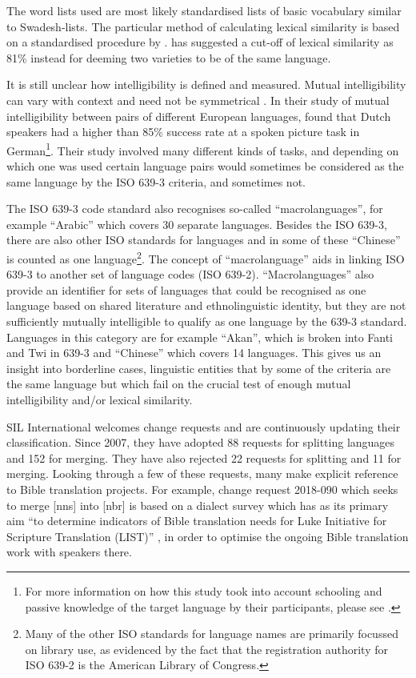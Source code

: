 \documentclass[a4paper,10pt]{article} %
\begin{document}
The word lists used are most likely standardised lists of basic vocabulary similar to Swadesh-lists. The particular method of calculating lexical similarity is based on a standardised procedure by \citet{rensch1992calculating}. \citet[326]{swadesh1954perspectives} has suggested a cut-off of lexical similarity as 81\% instead for deeming two varieties to be of the same language. 

It is still unclear how intelligibility is defined and measured. Mutual intelligibility can vary with context and need not be symmetrical \citep[356]{NETTLE1998}. In their study of mutual intelligibility between pairs of different European languages, \citet{gooskens2017measuring} found that Dutch speakers had a higher than 85\% success rate at a spoken picture task in German\footnote{For more information on how this study took into account schooling and passive knowledge of the target language by their participants, please see \citet{gooskens2017measuring}.}. Their study involved many different kinds of tasks, and depending on which one was used certain language pairs would sometimes be considered as the same language by the ISO 639-3 criteria, and sometimes not.

The ISO 639-3 code standard also recognises so-called ``macrolanguages'', for example ``Arabic'' which covers 30 separate languages. Besides the ISO 639-3, there are also other ISO standards for languages and in some of these ``Chinese'' is counted as one language\footnote{Many of the other ISO standards for language names are primarily focussed on library use, as evidenced by the fact that the registration authority for ISO 639-2 is the American Library of Congress.}. The concept of ``macrolanguage'' aids in linking ISO 639-3 to another set of language codes (ISO 639-2). ``Macrolanguages'' also provide an identifier for sets of languages that could be recognised as one language based on shared literature and ethnolinguistic identity, but they are not sufficiently mutually intelligible to qualify as one language by the 639-3 standard. Languages in this category are for example ``Akan'', which is broken into Fanti and Twi in 639-3 and ``Chinese'' which covers 14 languages. This gives us an insight into borderline cases, linguistic entities that by some of the criteria are the same language but which fail on the crucial test of enough mutual intelligibility and/or lexical similarity. 

SIL International welcomes change requests and are continuously updating their classification. Since 2007, they have adopted 88 requests for splitting languages and 152 for merging. They have also rejected 22 requests for splitting and 11 for merging. Looking through a few of these requests, many make explicit reference to Bible translation projects. For example, change request 2018-090 which seeks to merge [nns] into [nbr] is based on a dialect survey which has as its primary aim ``to determine indicators of Bible translation needs for Luke Initiative for Scripture Translation (LIST)'' \citep{change_request_SIL_example}, in order to optimise the ongoing Bible translation work with speakers there.
\end{document}
